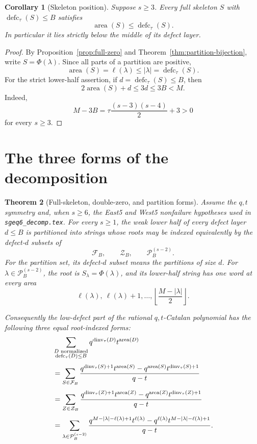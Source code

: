 \documentclass[11pt]{article}
\newtheorem{theorem}{Theorem}[section]
\newtheorem{corollary}[theorem]{Corollary}
\theoremstyle{definition}
\theoremstyle{remark}
\newcommand{\area}{\operatorname{area}}
\newcommand{\dinv}{\operatorname{dinv}}
\newcommand{\defc}{\operatorname{defc}}
\begin{document}
\begin{corollary}[Skeleton position]
\label{cor:skeleton-position}
Suppose $s\ge3$.
Every full skeleton $S$ with $\defc_\tau(S)\le B$ satisfies
\[
  \area(S)\le\defc_\tau(S).
\]
In particular it lies strictly below the middle of its defect layer.
\end{corollary}

\begin{proof}
By Proposition~\ref{prop:full-zero} and
Theorem~\ref{thm:partition-bijection}, write $S=\Phi(\lambda)$.  Since all
parts of a partition are positive,
\[
  \area(S)=\ell(\lambda)\le|\lambda|=\defc_\tau(S).
\]
For the strict lower-half assertion, if $d=\defc_\tau(S)\le B$, then
\[
  2\area(S)+d\le3d\le3B<M.
\]
Indeed,
\[
 M-3B=\tau\frac{(s-3)(s-4)}2+3>0
\]
for every $s\ge3$.
\end{proof}

\section{The three forms of the decomposition}

\begin{theorem}[Full-skeleton, double-zero, and partition forms]
\label{thm:three-forms}
Assume the $q,t$ symmetry and, when $s\ge6$, the East5 and West5 nonfailure
hypotheses used in \texttt{sgeq6\_decomp.tex}.  For every $s\ge1$, the weak
lower half of every defect layer $d\le B$ is partitioned into strings whose
roots may be indexed equivalently by the defect-$d$ subsets of
\[
  \mathcal F_B,
  \qquad \mathcal Z_B,
  \qquad \mathcal P_B^{(s-2)}.
\]
For the partition set, its defect-$d$ subset means the partitions of size
$d$.
For $\lambda\in\mathcal P_B^{(s-2)}$, the root is
$S_\lambda=\Phi(\lambda)$, and its lower-half string has one word at every
area
\[
  \ell(\lambda),\ \ell(\lambda)+1,\ldots,
  \left\lfloor\frac{M-|\lambda|}{2}\right\rfloor.
\]

Consequently the low-defect part of the rational $q,t$-Catalan polynomial
has the following three equal root-indexed forms:
\begin{align}
 &\sum_{\substack{D\text{ normalized}\\\defc_\tau(D)\le B}}
 q^{\dinv_\tau(D)}t^{\area(D)}
 \notag\\[1mm]
 &=\sum_{S\in\mathcal F_B}
 \frac{
 q^{\dinv_\tau(S)+1}t^{\area(S)}
 -q^{\area(S)}t^{\dinv_\tau(S)+1}
 }{q-t}
 \label{eq:full-form}\\[1mm]
 &=\sum_{Z\in\mathcal Z_B}
 \frac{
 q^{\dinv_\tau(Z)+1}t^{\area(Z)}
 -q^{\area(Z)}t^{\dinv_\tau(Z)+1}
 }{q-t}
 \label{eq:zero-form}\\[1mm]
 &=\sum_{\lambda\in\mathcal P_B^{(s-2)}}
 \frac{
 q^{M-|\lambda|-\ell(\lambda)+1}t^{\ell(\lambda)}
 -q^{\ell(\lambda)}t^{M-|\lambda|-\ell(\lambda)+1}
 }{q-t}.
 \label{eq:partition-form}
\end{align}
\end{theorem}
\end{document}
